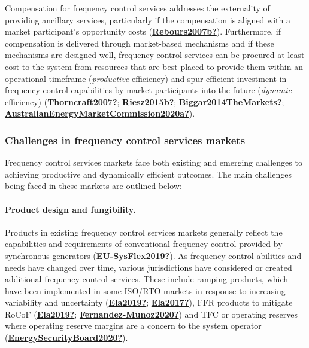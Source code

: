 \documentclass[12pt,a4paper,]{report}
\begin{document}
Compensation for frequency control services addresses the externality of
providing ancillary services, particularly if the compensation is
aligned with a market participant's opportunity costs
(\protect\hyperlink{ref-Rebours2007b}{\textbf{Rebours2007b?}}).
Furthermore, if compensation is delivered through market-based
mechanisms and if these mechanisms are designed well, frequency control
services can be procured at least cost to the system from resources that
are best placed to provide them within an operational timeframe
(\emph{productive} efficiency) and spur efficient investment in
frequency control capabilities by market participants into the future
(\emph{dynamic} efficiency)
(\protect\hyperlink{ref-Thorncraft2007}{\textbf{Thorncraft2007?}};
\protect\hyperlink{ref-Riesz2015b}{\textbf{Riesz2015b?}};
\protect\hyperlink{ref-Biggar2014TheMarkets}{\textbf{Biggar2014TheMarkets?}};
\protect\hyperlink{ref-AustralianEnergyMarketCommission2020a}{\textbf{AustralianEnergyMarketCommission2020a?}}).

\hypertarget{sec:challgnes_fcas_markets}{%
\subsubsection{Challenges in frequency control services
markets}\label{sec:challgnes_fcas_markets}}

Frequency control services markets face both existing and emerging
challenges to achieving productive and dynamically efficient outcomes.
The main challenges being faced in these markets are outlined below:

\hypertarget{product-design-and-fungibility.}{%
\paragraph{Product design and
fungibility.}\label{product-design-and-fungibility.}}

Products in existing frequency control services markets generally
reflect the capabilities and requirements of conventional frequency
control provided by synchronous generators
(\protect\hyperlink{ref-EU-SysFlex2019}{\textbf{EU-SysFlex2019?}}). As
frequency control abilities and needs have changed over time, various
jurisdictions have considered or created additional frequency control
services. These include ramping products, which have been implemented in
some ISO/RTO markets in response to increasing variability and
uncertainty (\protect\hyperlink{ref-Ela2019}{\textbf{Ela2019?}};
\protect\hyperlink{ref-Ela2017}{\textbf{Ela2017?}}), FFR products to
mitigate RoCoF (\protect\hyperlink{ref-Ela2019}{\textbf{Ela2019?}};
\protect\hyperlink{ref-Fernandez-Munoz2020}{\textbf{Fernandez-Munoz2020?}})
and TFC or operating reserves where operating reserve margins are a
concern to the system operator
(\protect\hyperlink{ref-EnergySecurityBoard2020}{\textbf{EnergySecurityBoard2020?}}).
\end{document}
